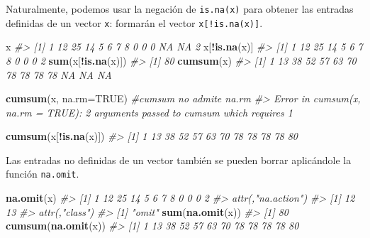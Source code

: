 \documentclass[
]{book}
\newenvironment{Shaded}{\begin{snugshade}}{\end{snugshade}}
\newcommand{\CommentTok}[1]{\textcolor[rgb]{0.56,0.35,0.01}{\textit{#1}}}
\newcommand{\DataTypeTok}[1]{\textcolor[rgb]{0.13,0.29,0.53}{#1}}
\newcommand{\KeywordTok}[1]{\textcolor[rgb]{0.13,0.29,0.53}{\textbf{#1}}}
\newcommand{\NormalTok}[1]{#1}
\newcommand{\OperatorTok}[1]{\textcolor[rgb]{0.81,0.36,0.00}{\textbf{#1}}}
\newcommand{\OtherTok}[1]{\textcolor[rgb]{0.56,0.35,0.01}{#1}}
\theoremstyle{definition}
\theoremstyle{definition}
\theoremstyle{definition}
\theoremstyle{remark}
\begin{document}
Naturalmente, podemos usar la negación de \texttt{is.na(x)} para obtener las entradas
definidas de un vector \texttt{x}: formarán el vector \texttt{x{[}!is.na(x){]}}.

\begin{Shaded}
\begin{Highlighting}[]
\NormalTok{x}
\CommentTok{\#\textgreater{}  [1]  1 12 25 14  5  6  7  8  0  0  0 NA NA  2}
\NormalTok{x[}\OperatorTok{!}\KeywordTok{is.na}\NormalTok{(x)]}
\CommentTok{\#\textgreater{}  [1]  1 12 25 14  5  6  7  8  0  0  0  2}
\KeywordTok{sum}\NormalTok{(x[}\OperatorTok{!}\KeywordTok{is.na}\NormalTok{(x)])}
\CommentTok{\#\textgreater{} [1] 80}
\KeywordTok{cumsum}\NormalTok{(x)}
\CommentTok{\#\textgreater{}  [1]  1 13 38 52 57 63 70 78 78 78 78 NA NA NA}
\end{Highlighting}
\end{Shaded}

\begin{Shaded}
\begin{Highlighting}[]
\KeywordTok{cumsum}\NormalTok{(x, }\DataTypeTok{na.rm=}\OtherTok{TRUE}\NormalTok{) }\CommentTok{\#cumsum no admite na.rm}
\CommentTok{\#\textgreater{} Error in cumsum(x, na.rm = TRUE): 2 arguments passed to \textquotesingle{}cumsum\textquotesingle{} which requires 1}
\end{Highlighting}
\end{Shaded}

\begin{Shaded}
\begin{Highlighting}[]
\KeywordTok{cumsum}\NormalTok{(x[}\OperatorTok{!}\KeywordTok{is.na}\NormalTok{(x)])}
\CommentTok{\#\textgreater{}  [1]  1 13 38 52 57 63 70 78 78 78 78 80}
\end{Highlighting}
\end{Shaded}

Las entradas no definidas de un vector también se pueden borrar aplicándole la función \texttt{na.omit}.

\begin{Shaded}
\begin{Highlighting}[]
\KeywordTok{na.omit}\NormalTok{(x)}
\CommentTok{\#\textgreater{}  [1]  1 12 25 14  5  6  7  8  0  0  0  2}
\CommentTok{\#\textgreater{} attr(,"na.action")}
\CommentTok{\#\textgreater{} [1] 12 13}
\CommentTok{\#\textgreater{} attr(,"class")}
\CommentTok{\#\textgreater{} [1] "omit"}
\KeywordTok{sum}\NormalTok{(}\KeywordTok{na.omit}\NormalTok{(x))}
\CommentTok{\#\textgreater{} [1] 80}
\KeywordTok{cumsum}\NormalTok{(}\KeywordTok{na.omit}\NormalTok{(x))}
\CommentTok{\#\textgreater{}  [1]  1 13 38 52 57 63 70 78 78 78 78 80}
\end{Highlighting}
\end{Shaded}
\end{document}
